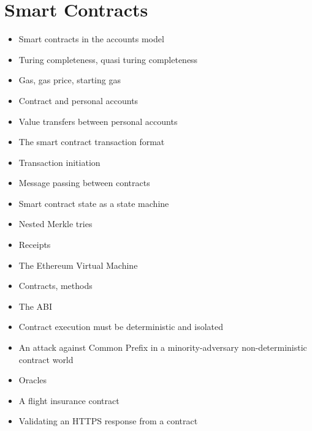 \chapter{Smart Contracts}

{\color{red}
\begin{itemize}
\item Smart contracts in the accounts model
\item Turing completeness, quasi turing completeness
\item Gas, gas price, starting gas
\item Contract and personal accounts
\item Value transfers between personal accounts
\item The smart contract transaction format
\item Transaction initiation
\item Message passing between contracts
\item Smart contract state as a state machine
\item Nested Merkle tries
\item Receipts
\item The Ethereum Virtual Machine
\item Contracts, methods
\item The ABI
\item Contract execution must be deterministic and isolated
\item An attack against Common Prefix in a minority-adversary non-deterministic contract world
\item Oracles
\item A flight insurance contract
\item Validating an HTTPS response from a contract
\end{itemize}
}
